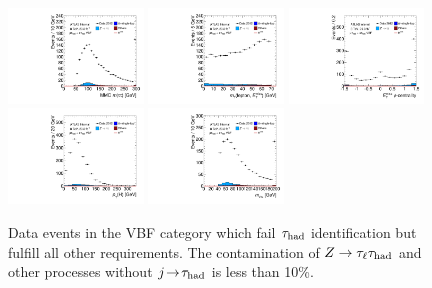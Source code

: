 \begin{figure}[tp]
  \includegraphics[width=0.32\textwidth]{figures/antitaus/mMMC}
  \includegraphics[width=0.32\textwidth]{figures/antitaus/mT}
  \includegraphics[width=0.32\textwidth]{figures/antitaus/met-phi-centrality}
  \includegraphics[width=0.32\textwidth]{figures/antitaus/H-pt-hi}
  \includegraphics[width=0.32\textwidth]{figures/antitaus/mvis}
  \caption{Data events in the VBF category which fail $\tau_\text{had}$ identification but fulfill all other requirements. The contamination of $Z\rightarrow\tau_\ell\tau_\text{had}$ and other processes without $j\!\rightarrow\!\tau_\text{had}$ is less than 10\%.}
  \label{fig:backgrounds-antitaus-taus}
\end{figure}

\clearpage

